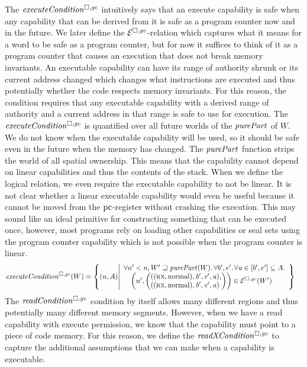 \begin{jversion}
The $\execCond{}$ intuitively says that an execute capability is safe when any capability that can be derived from it is safe as a program counter now and in the future.
We later define the $\mathcal{E}^{\square,\mathit{gc}}$-relation which captures what it means for a word to be safe as a program counter, but for now it suffices to think of it as a program counter that causes an execution that does not break memory invariants.
An executable capability can have its range of authority shrunk or its current address changed which changes what instructions are executed and thus potentially whether the code respects memory invariants.
For this reason, the condition requires that any executable capability with a derived range of authority and a current address in that range is safe to use for execution.
The $\execCond{}$ is quantified over all future worlds of the $\purePart{}$ of $W$.
We do not know when the executable capability will be used, so it should be safe even in the future when the memory has changed.
The $\purePart{}$ function strips the world of all spatial ownership.
This means that the capability cannot depend on linear capabilities and thus the contents of the stack.
When we define the logical relation, we even require the executable capability to not be linear.
It is not clear whether a linear executable capability would even be useful because it cannot be moved from the $\mathrm{pc}$-register without crashing the execution.
This may sound like an ideal primitive for constructing something that can be executed once, however, most programs rely on loading other capabilities or seal sets using the program counter capability which is not possible when the program counter is linear.
\begin{align*}
  \execCond{W} &=
  \left\{ \npair{A} \middle|
    \begin{array}{l}
      \forall n' < n, W' \future \purePart{W}\ldotp \forall b',e'\ldotp \forall \aaddr \in [b',e'] \subseteq A \ldotp\\
      \quad \npair[n']{\left( \arraycolsep=0pt\array{l}((\rx,\normal),\baddr',\eaddr',\aaddr),\\((\rx,\normal),\baddr',\eaddr',\aaddr)\endarray\right)} \in \lre(W')
    \end{array}
    \right\}
\end{align*}
The $\readCond{}$ condition by itself allows many different regions and thus potentially many different memory segments.
However, when we have a read capability with execute permission, we know that the capability must point to a piece of code memory.
For this reason, we define the $\xReadCond{}$ to capture the additional assumptions that we can make when a capability is executable.

\end{jversion}
